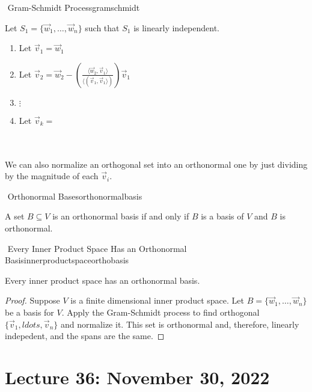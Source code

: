         \begin{theorem}{\Stop\,\,Gram-Schmidt Process}{gramschmidt}
            
            Let \(S_1=\{\vec{w}_1,\ldots,\vec{w}_n\}\) such that \(S_1\) is linearly independent.
            \begin{enumerate}
                \item Let \(\vec{v}_1=\vec{w}_1\)
                \item Let \(\vec{v}_2=\vec{w}_2-\left(\frac{\langle\vec{w}_2,\vec{v}_1\rangle}{\langle(\vec{v}_1,\vec{v}_1\rangle)}\right)\vec{v}_1\)
                \item \(\vdots\)
                \item Let \(\vec{v}_k=\)
            \end{enumerate}
            \DOTHISLATER

        \end{theorem}
        \vphantom
        \\
        \\
        We can also normalize an orthogonal set into an orthonormal one by just dividing by the magnitude of each \(\vec{v}_i\).
        \DOTHISLATER
        \begin{definition}{\Stop\,\,Orthonormal Bases}{orthonormalbasis}

            A set \(B\subseteq V\) is an orthonormal basis if and only if \(B\) is a basis of \(V\) and \(B\) is orthonormal.
            
        \end{definition}
        \begin{theorem}{\Stop\,\,Every Inner Product Space Has an Orthonormal Basis}{innerproductspaceorthobasis}

            Every inner product space has an orthonormal basis.
            \begin{proof}
                Suppose \(V\) is a finite dimensional inner product space. Let \(B=\{\vec{w}_1,\ldots,\vec{w}_n\}\) be a basis for \(V\). Apply the Gram-Schmidt process to find orthogonal \(\{\vec{v}_1,ldots,\vec{v}_n\}\) and normalize it. This set is orthonormal and, therefore, linearly indepedent, and the spans are the same.
                \DOTHISLATER
            \end{proof}
            
        \end{theorem}

        \pagebreak

\section{Lecture 36: November 30, 2022}

    \subsection{}